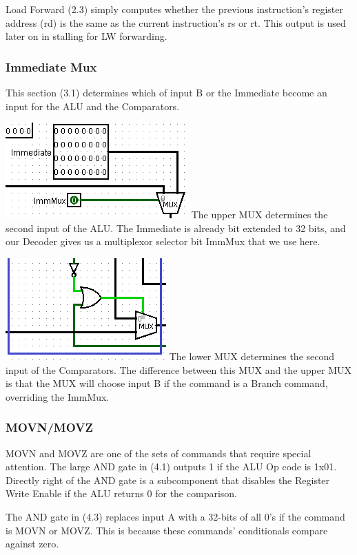 \documentclass{article}
\begin{document}
Load Forward (2.3) simply computes whether the previous instruction's register address (rd) is the same as the current instruction's rs or rt. This output is used later on in stalling for LW forwarding.

\subsubsection{Immediate Mux}
This section (3.1) determines which of input B or the Immediate become an input for the ALU and the Comparators.

\includegraphics{Immediate.png}
The upper MUX determines the second input of the ALU. The Immediate is already bit extended to 32 bits, and our Decoder gives us a multiplexor selector bit ImmMux that we use here. 

\includegraphics{Immediate2.png}
The lower MUX determines the second input of the Comparators. The difference between this MUX and the upper MUX is that the MUX will choose input B if the command is a Branch command, overriding the ImmMux. 

\subsubsection{MOVN/MOVZ}
MOVN and MOVZ are one of the sets of commands that require special attention. The large AND gate in (4.1) outputs 1 if the ALU Op code is 1x01. Directly right of the AND gate is a subcomponent that disables the Register Write Enable if the ALU returns 0 for the comparison. 

The AND gate in (4.3) replaces input A with a 32-bits of all 0's if the command is MOVN or MOVZ. This is because these commands' conditionals compare against zero. 
\end{document}
